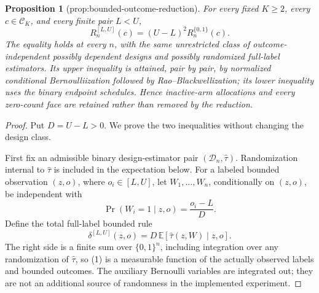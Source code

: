 \documentclass{article}
\newtheorem{proposition}{Proposition}
\begin{document}
\begin{proposition}[prop:bounded-outcome-reduction]\label{prop:bounded-outcome-reduction}
For every fixed \(K\ge2\), every \(c\in\mathcal C_K\), and every finite pair \(L<U\),
\[
R_n^{[L,U]}(c)=(U-L)^2R_n^{\{0,1\}}(c).
\]
The equality holds at every \(n\), with the same unrestricted class of outcome-independent possibly dependent designs and possibly randomized full-label estimators.  Its upper inequality is attained, pair by pair, by normalized conditional Bernoulliization followed by Rao--Blackwellization; its lower inequality uses the binary endpoint schedules.  Hence inactive-arm allocations and every zero-count face are retained rather than removed by the reduction.
\end{proposition}
\begin{proof}
Put \(D=U-L>0\).  We prove the two inequalities without changing the design class.

First fix an admissible binary design-estimator pair \((\mathcal D_n,\widehat\tau)\).  Randomization internal to \(\widehat\tau\) is included in the expectation below.  For a labeled bounded observation \((z,o)\), where \(o_i\in[L,U]\), let \(W_1,\ldots,W_n\), conditionally on \((z,o)\), be independent with
\[
\Pr(W_i=1\mid z,o)=\frac{o_i-L}{D}.
\]
Define the total full-label bounded rule
\[
\delta^{[L,U]}(z,o)
=D\,\mathbb E\!\left[\widehat\tau(z,W)\mid z,o\right].
\tag{1}
\]
The right side is a finite sum over \(\{0,1\}^n\), including integration over any randomization of \(\widehat\tau\), so (1) is a measurable function of the actually observed labels and bounded outcomes.  The auxiliary Bernoulli variables are integrated out; they are not an additional source of randomness in the implemented experiment.


\end{proof}
\end{document}
